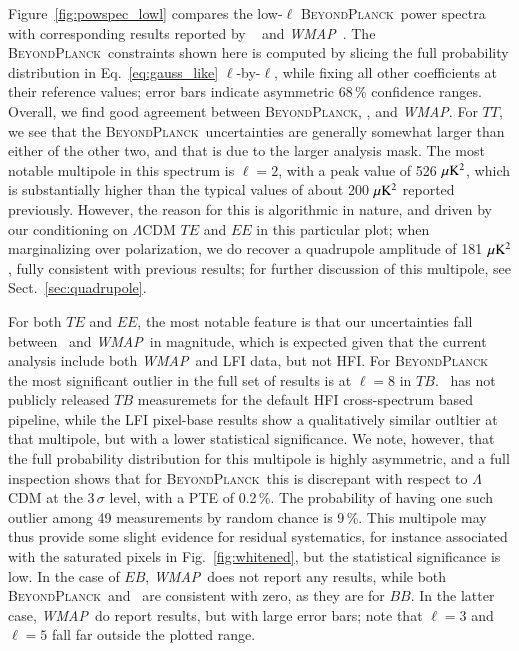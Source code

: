 \documentclass[twocolumn]{aa}
\def\WMAP{\textit{WMAP}}
\newcommand{\BP}{\textsc{BeyondPlanck}}
\begin{document}
Figure~\ref{fig:powspec_lowl} compares the low-$\ell$ \BP\ power
spectra with corresponding results reported by
\Planck\ \citep{planck2016-l05} and \WMAP\ \citep{hinshaw2012}. The
\BP\ constraints shown here is computed by slicing the full
probability distribution in Eq.~\eqref{eq:gauss_like}
$\ell$-by-$\ell$, while fixing all other coefficients at their
reference values; error bars indicate asymmetric 68\,\% confidence
ranges. Overall, we find good agreement between \BP, \Planck, and
\WMAP. For $TT$, we see that the \BP\ uncertainties are generally
somewhat larger than either of the other two, and that is due to the
larger analysis mask. The most notable multipole in this spectrum is
$\ell=2$, with a peak value of 526\,$\muK^2$, which is substantially
higher than the typical values of about 200\,$\muK^2$ reported
previously. However, the reason for this is algorithmic in nature, and
driven by our conditioning on $\Lambda$CDM $TE$ and $EE$ in this
particular plot; when marginalizing over polarization, we do recover a
quadrupole amplitude of 181\,$\muK^2$, fully consistent with previous
results; for further discussion of this multipole, see
Sect.~\ref{sec:quadrupole}.

For both $TE$ and $EE$, the most notable feature is that our
uncertainties fall between \Planck\ and \WMAP\ in magnitude, which is
expected given that the current analysis include both \WMAP\ and LFI
data, but not HFI. For \BP\, the most significant outlier in the full set of results is at $\ell=8$ in $TB$. \Planck\ has not publicly released $TB$ measuremets for the default HFI cross-spectrum based pipeline, while the LFI pixel-base results show a qualitatively similar outltier at that multipole, but with a lower statistical significance.  We note,
however, that the full probability distribution for this multipole is
highly asymmetric, and a full inspection shows that for \BP\ this is discrepant
with respect to $\Lambda$CDM at the $3\,\sigma$ level, with a PTE of
0.2\,\%. The probability of having one such outlier among 49
measurements by random chance is 9\,\%. This multipole may thus
provide some slight evidence for residual systematics, for instance
associated with the saturated pixels in Fig.~\ref{fig:whitened}, but
the statistical significance is low. In the case of $EB$, \WMAP\ does
not report any results, while both \BP\ and \Planck\ are consistent
with zero, as they are for $BB$. In the latter case, \WMAP\ do report
results, but with large error bars; note that $\ell=3$  and $\ell=5$ fall far
outside the plotted range.
\end{document}
